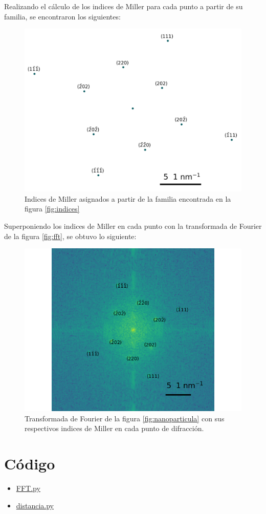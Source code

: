 \documentclass[reprint,amsmath,amssymb,aps,]{revtex4-2}
\begin{document}
Realizando el cálculo de los indices de Miller para cada punto a partir de su familia, se encontraron los siguientes:
\begin{figure}[H]
    \includegraphics[scale=0.4]{../Graphics/lattice.png}
    \caption{Indices de Miller asignados a partir de la familia encontrada en la figura \ref{fig:indices}}
    \label{fig:lattice}
\end{figure}
Superponiendo los indices de Miller en cada punto con la transformada de Fourier de la figura \ref{fig:fft}, se obtuvo lo siguiente:
\begin{figure}[H]
    \includegraphics[scale=0.4]{../Graphics/caras.png}
    \caption{Transformada de Fourier de la figura \ref{fig:nanoparticula} con sus respectivos indices de Miller en cada punto de difracción.}
\end{figure}
\section{Código}
\begin{itemize}
    \item \href{https://github.com/giovannilopez9808/Notas_Agosto_2020/blob/master/AMC/Reto2/FFT.py}{FFT.py}
    \item \href{https://github.com/giovannilopez9808/Notas_Agosto_2020/blob/master/AMC/Reto2/distancia.py}{distancia.py}
\end{itemize}

\nocite{*}

\end{document}
